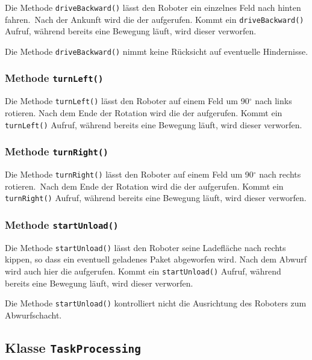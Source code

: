 Die Methode \texttt{driveBackward()} lässt den Roboter ein einzelnes Feld nach hinten fahren.~Nach der Ankunft wird die  der  aufgerufen.
Kommt ein \texttt{driveBackward()} Aufruf, während bereits eine Bewegung läuft, wird dieser verworfen.

Die Methode \texttt{driveBackward()} nimmt keine Rücksicht auf eventuelle Hindernisse.


\subsubsection{Methode \texttt{turnLeft()}}
\label{method:turnleft}

Die Methode \texttt{turnLeft()} lässt den Roboter auf einem Feld um 90$^{\circ}$ nach links rotieren. 
Nach dem Ende der Rotation wird die  der  aufgerufen.
Kommt ein \texttt{turnLeft()} Aufruf, während bereits eine Bewegung läuft, wird dieser verworfen.


\subsubsection{Methode \texttt{turnRight()}}
\label{method:turnright}

Die Methode \texttt{turnRight()} lässt den Roboter auf einem Feld um 90$^{\circ}$ nach rechts rotieren.~Nach dem Ende der Rotation wird die  der  aufgerufen.
Kommt ein \texttt{turnRight()} Aufruf, während bereits eine Bewegung läuft, wird dieser verworfen.

\enlargethispage{2\baselineskip}

\subsubsection{Methode \texttt{startUnload()}}
\label{method:unload}

Die Methode \texttt{startUnload()} lässt den Roboter seine Ladefläche nach rechts kippen, so dass ein eventuell geladenes Paket abgeworfen wird. 
Nach dem Abwurf wird auch hier die  aufgerufen.
Kommt ein \texttt{startUnload()} Aufruf, während bereits eine Bewegung läuft, wird dieser verworfen.

Die Methode \texttt{startUnload()} kontrolliert nicht die Ausrichtung des Roboters zum Abwurfschacht.




\subsection{Klasse \texttt{TaskProcessing}}
\label{class:tasks}

